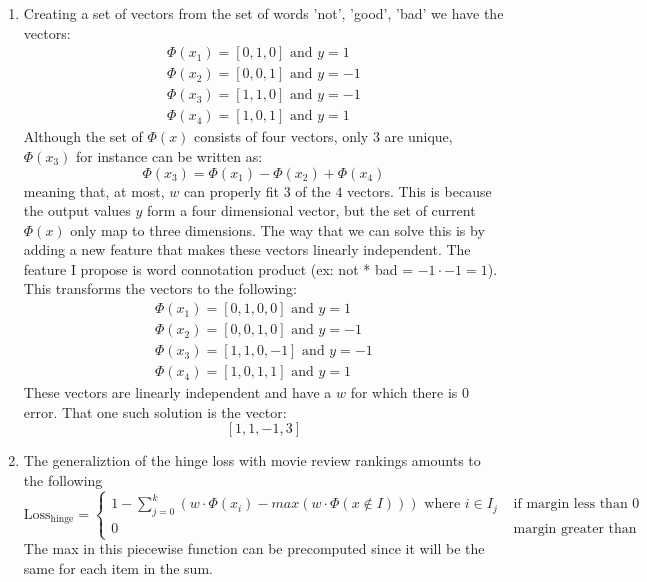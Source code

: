 \documentclass[12pt]{article}
\begin{document}
\begin{enumerate}[label=(\alph*)]
		\item Creating a set of vectors from the set of words {'not', 'good', 'bad'}
			we have the vectors:
			\begin{gather*}
				\Phi(x_1) = [0, 1, 0] \text{ and } y = 1 \\
				\Phi(x_2) = [0, 0, 1] \text{ and } y = -1 \\
				\Phi(x_3) = [1, 1, 0] \text{ and } y = -1 \\
				\Phi(x_4) = [1, 0, 1] \text{ and } y = 1
			\end{gather*}
			Although the set of \(\Phi(x)\) consists of four vectors, only 3 are
			unique, \(\Phi(x_3)\) for instance can be written as:
			\[
				\Phi(x_3) = \Phi(x_1) - \Phi(x_2) + \Phi(x_4)
			\]
			meaning that, at most, \(w\) can properly fit \(3\) of the \(4\)
			vectors. This is because the output values \(y\) form a four
			dimensional vector, but the set of current \(\Phi(x)\) only
			map to three dimensions. The way that we can solve this is by 
			adding a new feature that makes these vectors linearly independent.
			The feature I propose is word connotation product
			(ex: not * bad = \(-1 \cdot -1 = 1\)).
			This transforms the vectors to the following:
			\begin{gather*}
				\Phi(x_1) = [0, 1, 0, 0] \text{ and } y = 1 \\
				\Phi(x_2) = [0, 0, 1, 0] \text{ and } y = -1 \\
				\Phi(x_3) = [1, 1, 0, -1] \text{ and } y = -1 \\
				\Phi(x_4) = [1, 0, 1, 1] \text{ and } y = 1
			\end{gather*}
			These vectors are linearly independent and have a \(w\)
			for which there is \(0\) error. That one such solution
			is the vector:
			\[
				[1, 1, -1, 3]
			\]

		\item The generaliztion of the hinge loss with movie review
			rankings amounts to the following
			\[
				\text{Loss}_\text{hinge} =
					\begin{cases}
						1 - \sum_{j=0}^k (w \cdot \Phi(x_i) - max(w \cdot \Phi(x\notin I))) \text{ where } i \in I_j & \text{ if margin less than 0 } \\
						0 & \text{ margin greater than 1 } 
					\end{cases}
			\]
			The max in this piecewise function can be precomputed since it will be the same for each item in the sum.

	\end{enumerate}
\end{document}
